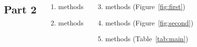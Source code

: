 \begin{columns}
{  \subsection{Part 2}
  \begin{enumerate}
    \item methods
    \item methods
  \end{enumerate}
  \vspace{1em}
  \begin{enumerate}
    \setcounter{enumi}{2}
    \item methods (Figure~\ref{fig:first})
    \item methods (Figure~\ref{fig:second})
    \item methods (Table~\ref{tab:main})
  \end{enumerate}
}
\end{columns}
